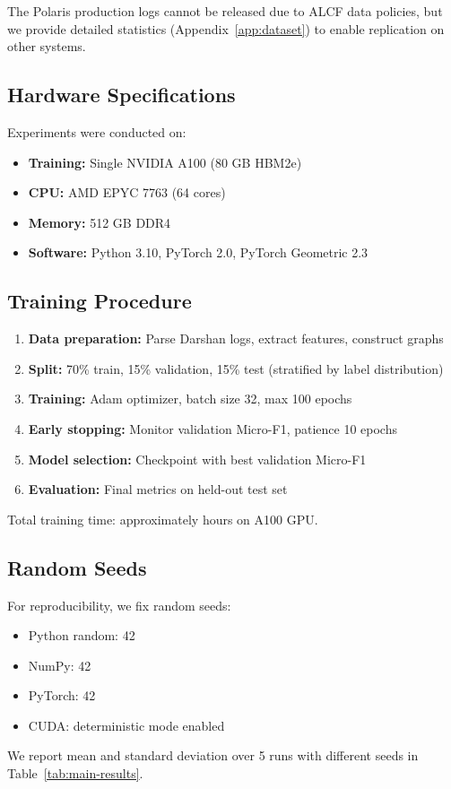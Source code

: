 The Polaris production logs cannot be released due to ALCF data policies, but we provide detailed statistics (Appendix~\ref{app:dataset}) to enable replication on other systems.

\subsection{Hardware Specifications}

Experiments were conducted on:
\begin{itemize}
    \item \textbf{Training:} Single NVIDIA A100 (80 GB HBM2e)
    \item \textbf{CPU:} AMD EPYC 7763 (64 cores)
    \item \textbf{Memory:} 512 GB DDR4
    \item \textbf{Software:} Python 3.10, PyTorch 2.0, PyTorch Geometric 2.3
\end{itemize}

\subsection{Training Procedure}

\begin{enumerate}
    \item \textbf{Data preparation:} Parse Darshan logs, extract features, construct graphs
    \item \textbf{Split:} 70\% train, 15\% validation, 15\% test (stratified by label distribution)
    \item \textbf{Training:} Adam optimizer, batch size 32, max 100 epochs
    \item \textbf{Early stopping:} Monitor validation Micro-F1, patience 10 epochs
    \item \textbf{Model selection:} Checkpoint with best validation Micro-F1
    \item \textbf{Evaluation:} Final metrics on held-out test set
\end{enumerate}

Total training time: approximately  hours on A100 GPU.

\subsection{Random Seeds}

For reproducibility, we fix random seeds:
\begin{itemize}
    \item Python random: 42
    \item NumPy: 42
    \item PyTorch: 42
    \item CUDA: deterministic mode enabled
\end{itemize}

We report mean and standard deviation over 5 runs with different seeds in Table~\ref{tab:main-results}.
